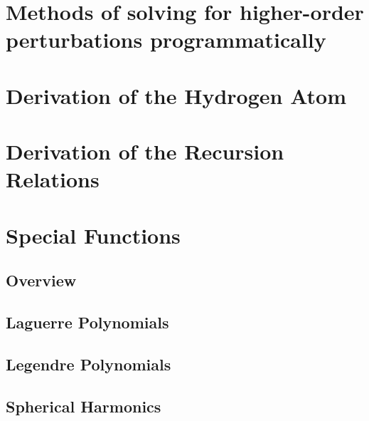 \chapter{Methods of solving for higher-order perturbations programmatically}
\chapter{Derivation of the Hydrogen Atom}
\chapter{Derivation of the Recursion Relations}
\chapter{Special Functions}
    \section{Overview}
    \section{Laguerre Polynomials} \label{sec:Laguerre_Polynomial}
    \section{Legendre Polynomials} \label{sec:Legendre_Polynomial}
    \section{Spherical Harmonics}